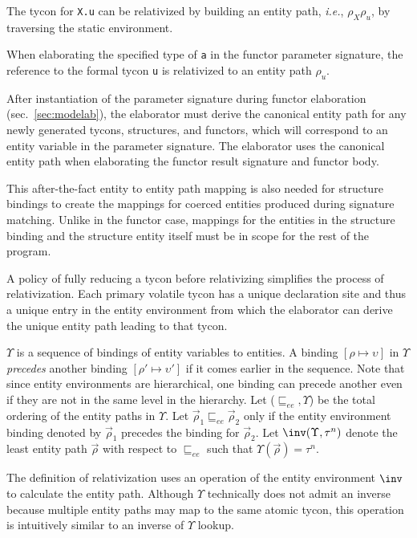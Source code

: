 The tycon for \lstinline{X.u} can be relativized by building an entity path, \emph{i.e.}, $\rho_X\rho_u$, by traversing the static environment. 

When elaborating the specified type of \lstinline{a} in the functor parameter signature, the reference to the formal tycon \lstinline{u} is relativized to an entity path $\rho_u$. 

After instantiation of the parameter signature during functor elaboration (sec.~\ref{sec:modelab}),  the elaborator must derive the canonical entity path for any newly generated tycons, structures, and functors, which will correspond to an entity variable in the parameter signature. The elaborator uses the canonical entity path when elaborating the functor result signature and functor body. 

This after-the-fact entity to entity path mapping is also needed for structure bindings to create the mappings for coerced entities produced during signature matching. Unlike in the functor case, mappings for the entities in the structure binding and the structure entity itself must be in scope for the rest of the program. 

A policy of fully reducing a tycon before relativizing 
simplifies the process of relativization. Each primary
volatile tycon has a unique declaration site and thus a unique entry in the
entity environment from which the elaborator can derive the unique
entity path leading to that tycon. 

$\Upsilon$ is a sequence of bindings of entity variables to
entities. A binding $[\rho\mapsto\upsilon]$ in $\Upsilon$
\emph{precedes} another binding $[\rho'\mapsto\upsilon']$ if it comes
earlier in the sequence. Note that since entity environments are
hierarchical, one binding can precede another even if they are not in
the same level in the hierarchy.  Let ($\sqsubseteq_{ee}, \Upsilon$) be the total ordering of
the entity paths in $\Upsilon$. Let $\vec{\rho}_1 \sqsubseteq_{ee}
\vec{\rho}_2$ only if the entity environment binding denoted by
$\vec{\rho}_1$ precedes the binding for $\vec{\rho}_2$. Let
$\inv(\Upsilon, \tau^n)$ denote the least entity path $\vec{\rho}$ with respect to
$\sqsubseteq_{ee}$ such that $\Upsilon(\vec{\rho}) = \tau^n$. 

The definition of relativization
uses an operation of the entity environment $\inv$ to
calculate the entity path. Although $\Upsilon$ technically does not
admit an inverse because multiple entity paths may map to the same
atomic tycon, this operation is intuitively similar to an inverse of $\Upsilon$ lookup. 

